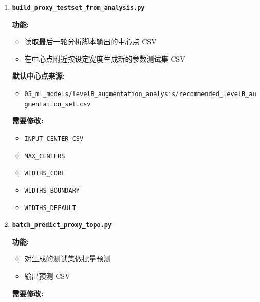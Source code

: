 \documentclass[lang=cn,scheme=chinese,color=blue,device=normal,toc=onecol,math=cm]{elegantbook}
\begin{document}
\begin{enumerate}
\item \textbf{\texttt{build\_\allowbreak{}proxy\_\allowbreak{}testset\_\allowbreak{}from\_\allowbreak{}analysis.py}}\par
 
\textbf{功能:}\par
 
\begin{itemize}
\item 读取最后一轮分析脚本输出的中心点 CSV
\item 在中心点附近按设定宽度生成新的参数测试集 CSV
\end{itemize}
 
\textbf{默认中心点来源:}\par
 
\begin{itemize}
\item \texttt{05\_\allowbreak{}ml\_\allowbreak{}models/\allowbreak{}levelB\_\allowbreak{}augmentation\_\allowbreak{}analysis/\allowbreak{}recommended\_\allowbreak{}levelB\_\allowbreak{}augmentation\_\allowbreak{}set.csv}
\end{itemize}
 
\textbf{需要修改:}\par
 
\begin{itemize}
\item \texttt{INPUT\_\allowbreak{}CENTER\_\allowbreak{}CSV}
\item \texttt{MAX\_\allowbreak{}CENTERS}
\item \texttt{WIDTHS\_\allowbreak{}CORE}
\item \texttt{WIDTHS\_\allowbreak{}BOUNDARY}
\item \texttt{WIDTHS\_\allowbreak{}DEFAULT}
\end{itemize}
\item \textbf{\texttt{batch\_\allowbreak{}predict\_\allowbreak{}proxy\_\allowbreak{}topo.py}}\par
 
\textbf{功能:}\par
 
\begin{itemize}
\item 对生成的测试集做批量预测
\item 输出预测 CSV
\end{itemize}
 
\textbf{需要修改:}\par
 

\end{enumerate}
\end{document}
